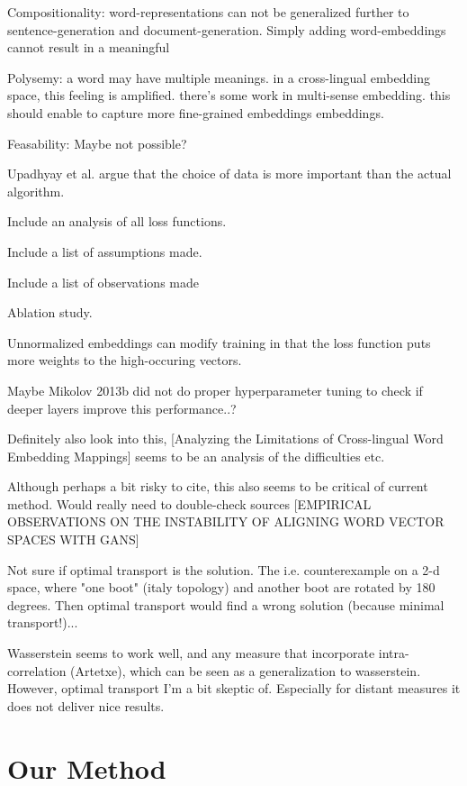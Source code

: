 \documentclass[a4paper,12pt,twoside,openright]{report}
\begin{document}
Compositionality:
word-representations can not be generalized further to sentence-generation and document-generation. 
Simply adding word-embeddings cannot result in a meaningful 

Polysemy:
a word may have multiple meanings.
in a cross-lingual embedding space, this feeling is amplified.
there's some work in multi-sense embedding.
this should enable to capture more fine-grained embeddings embeddings.

Feasability:
Maybe not possible?

Upadhyay et al. argue that the choice of data is more important than the actual algorithm.




Include an analysis of all loss functions.

Include a list of assumptions made.

Include a list of observations made

Ablation study.

Unnormalized embeddings can modify training in that the loss function puts more weights to the high-occuring vectors.

Maybe Mikolov 2013b did not do proper hyperparameter tuning to check if deeper layers improve this performance..?

Definitely also look into this, [Analyzing the Limitations of Cross-lingual Word Embedding Mappings] seems to be an analysis of the difficulties etc. 

Although perhaps a bit risky to cite, this also seems to be critical of current method. 
Would really need to double-check sources [EMPIRICAL OBSERVATIONS ON THE INSTABILITY OF ALIGNING WORD VECTOR SPACES WITH GANS]

Not sure if optimal transport is the solution. The i.e. counterexample on a 2-d space, where "one boot" (italy topology) and another boot are rotated by 180 degrees.
Then optimal transport would find a wrong solution (because minimal transport!)...

Wasserstein seems to work well, and any measure that incorporate intra-correlation (Artetxe), which can be seen as a generalization to wasserstein.
However, optimal transport I'm a bit skeptic of. 
Especially for distant measures it does not deliver nice results.

\chapter{Our Method}
\end{document}
